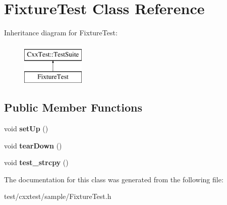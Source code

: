 \hypertarget{classFixtureTest}{\section{Fixture\-Test Class Reference}
\label{classFixtureTest}
}
Inheritance diagram for Fixture\-Test\-:\begin{figure}[H]
\begin{center}
\leavevmode
\includegraphics[height=2.000000cm]{classFixtureTest}
\end{center}
\end{figure}
\subsection*{Public Member Functions}
\begin{DoxyCompactItemize}
\item 
\hypertarget{classFixtureTest_a9ae41eaed04c146917655810eb98f81f}{void {\bfseries set\-Up} ()}\label{classFixtureTest_a9ae41eaed04c146917655810eb98f81f}

\item 
\hypertarget{classFixtureTest_acd647e2ed9c294ae5d6d986bd583dcce}{void {\bfseries tear\-Down} ()}\label{classFixtureTest_acd647e2ed9c294ae5d6d986bd583dcce}

\item 
\hypertarget{classFixtureTest_adaeddbf61bb1e8de4c8c29d9846cc710}{void {\bfseries test\-\_\-strcpy} ()}\label{classFixtureTest_adaeddbf61bb1e8de4c8c29d9846cc710}

\end{DoxyCompactItemize}


The documentation for this class was generated from the following file\-:\begin{DoxyCompactItemize}
\item 
test/cxxtest/sample/Fixture\-Test.\-h\end{DoxyCompactItemize}
